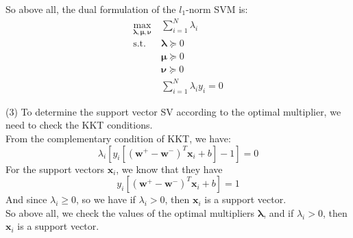 So above all, the dual formulation of the $l_1$-norm SVM is:
\begin{align*}
    \max_{\boldsymbol{\lambda}, \boldsymbol{\mu}, \boldsymbol{\nu}} &\ \sum_{i=1}^{N}\lambda_i \\
    \text{s.t. } &\ \boldsymbol{\lambda}\succeq 0 \\
    &\ \boldsymbol{\mu}\succeq 0 \\
    &\ \boldsymbol{\nu}\succeq 0 \\
    &\ \sum_{i=1}^{N}\lambda_iy_i = 0
\end{align*}

(3) To determine the support vector SV according to the optimal multiplier, we need to check the KKT conditions.\\
From the complementary condition of KKT, we have:
$$\lambda_i\left[y_i\left[(\mathbf{w}^+-\mathbf{w}^-)^T\mathbf{x}_i+b\right]-1\right] = 0$$
For the support vectors $\mathbf{x}_i$, we know that they have
$$y_i\left[(\mathbf{w}^+-\mathbf{w}^-)^T\mathbf{x}_i+b\right] = 1$$
And since $\lambda_i \geq 0$, so we have if $\lambda_i > 0$, then $\mathbf{x}_i$ is a support vector.\\

So above all, we check the values of the optimal multipliers $\boldsymbol{\lambda}$, and if $\lambda_i > 0$, then $\mathbf{x}_i$ is a support vector.\\